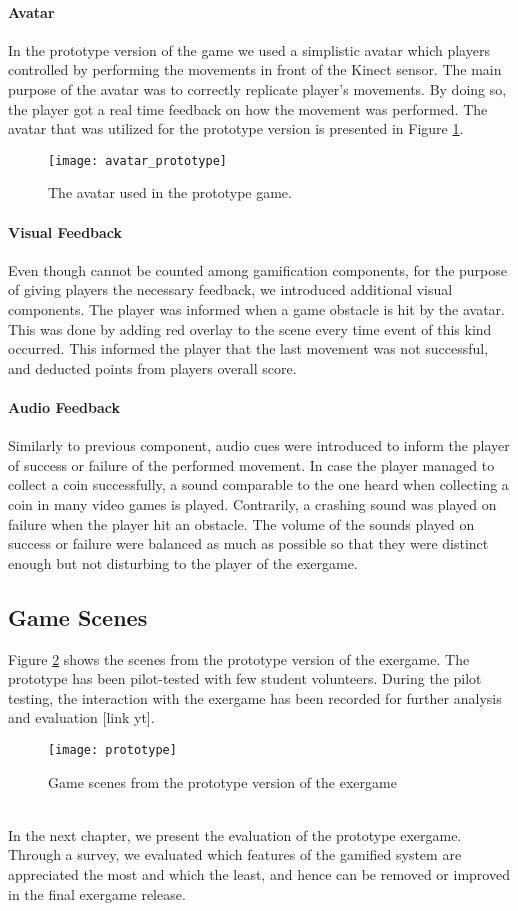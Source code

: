 \paragraph{Avatar}
In the prototype version of the game we used a simplistic avatar which players controlled by performing the movements in front of the Kinect sensor. The main purpose of the avatar was to correctly replicate player's movements. By doing so, the player got a real time feedback on how the movement was performed. The avatar that was utilized for the prototype version is presented in Figure \ref{fig:avatar_prototype}.\\
\begin{figure}[h]
    \centering
    \texttt{[image: avatar\_prototype]}
    \caption{The avatar used in the prototype game.}
    \label{fig:avatar_prototype}
\end{figure}
\paragraph{Visual Feedback}
Even though cannot be counted among gamification components, for the purpose of giving players the necessary feedback, we introduced additional visual components. The player was informed when a game obstacle is hit by the avatar. This was done by adding red overlay to the scene every time event of this kind occurred. This informed the player that the last movement was not successful, and deducted points from players overall score.
\paragraph{Audio Feedback}
Similarly to previous component, audio cues were introduced to inform the player of success or failure of the performed movement. In case the player managed to collect a coin successfully, a sound comparable to the one heard when collecting a coin in many video games is played. Contrarily, a crashing sound was played on failure when the player hit an obstacle. The volume of the sounds played on success or failure were balanced as much as possible so that they were distinct enough but not disturbing to the player of the exergame.
\subsection{Game Scenes}
Figure \ref{fig:prototype} shows the scenes from the prototype version of the exergame. The prototype has been pilot-tested with few student volunteers. During the pilot testing, the interaction with the exergame has been recorded for further analysis and evaluation [link yt]. 
\begin{figure}[h]
    \centering
    \texttt{[image: prototype]}
    \caption{Game scenes from the prototype version of the exergame}
    \label{fig:prototype}
\end{figure}\\
In the next chapter, we present the evaluation of the prototype exergame. Through a survey, we evaluated which features of the gamified system are appreciated the most and which the least, and hence can be removed or improved in the final exergame release.